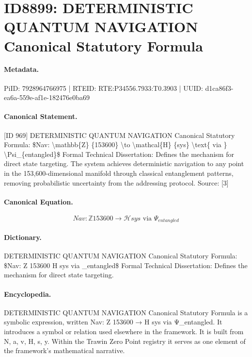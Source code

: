 \section*{ID8899: DETERMINISTIC QUANTUM NAVIGATION Canonical Statutory Formula}
\paragraph{Metadata.}
PiID: 7928964766975 | RTEID: RTE:P34556.7933:T0.3903 | UUID: d1ca86f3-ea6a-559e-af1e-182476e0ba69

\paragraph{Canonical Statement.}
[ID 969] DETERMINISTIC QUANTUM NAVIGATION Canonical Statutory Formula: \$Nav: \textbackslash{}mathbb\{Z\} \{153600\} \textbackslash{}to \textbackslash{}mathcal\{H\} \{sys\} \textbackslash{}text\{ via \} \textbackslash{}Psi\_\{entangled\}\$ Formal Technical Dissertation: Defines the mechanism for direct state targeting. The system achieves deterministic navigation to any point in the 153,600-dimensional manifold through classical entanglement patterns, removing probabilistic uncertainty from the addressing protocol. Source: [3]

\paragraph{Canonical Equation.}
\[
Nav: \mathbb{Z} {153600} \to \mathcal{H} {sys} \text{ via } \Psi_{entangled}
\]

\paragraph{Dictionary.}
DETERMINISTIC QUANTUM NAVIGATION Canonical Statutory Formula: \$Nav: Z 153600 H sys via \_entangled\$ Formal Technical Dissertation: Defines the mechanism for direct state targeting.

\paragraph{Encyclopedia.}
DETERMINISTIC QUANTUM NAVIGATION Canonical Statutory Formula is a symbolic expression, written Nav: Z 153600 → H sys via Ψ\_entangled. It introduces a symbol or relation used elsewhere in the framework. It is built from N, a, v, H, s, y. Within the Trawin Zero Point registry it serves as one element of the framework's mathematical narrative.
